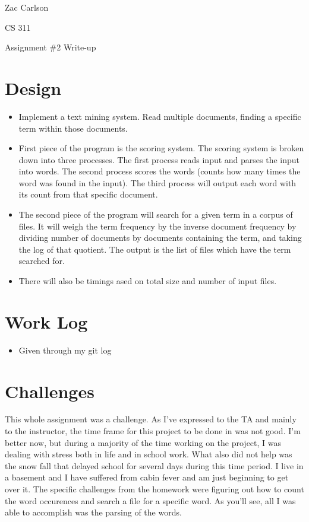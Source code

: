 \documentclass[12pt]{article}
\begin{document}
\hfill{Zac Carlson}

\hfill{CS 311}

\hfill{Assignment \#2 Write-up}

\null

\section{Design}

\begin{itemize}
\item Implement a text mining system. Read multiple documents, finding a specific term within those documents.
\item First piece of the program is the scoring system. The scoring system is broken down into three processes. The first process reads input and parses the input into words. The second process scores the words (counts how many times the word was found in the input). The third process will output each word with its count from that specific document. 
\item The second piece of the program will search for a given term in a corpus of files. It will weigh the term frequency by the inverse document frequency by dividing number of documents by documents containing the term, and taking the log of that quotient. The output is the list of files which have the term searched for.
\item There will also be timings ased on total size and number of input files.
\end{itemize}

\section{Work Log}
\begin{itemize}

\item Given through my git log

\end{itemize}

\section{Challenges}

This whole assignment was a challenge. As I've expressed to the TA and mainly to the instructor, the time frame for this project to be done in was not good. I'm better now, but during a majority of the time working on the project, I was dealing with stress both in life and in school work. What also did not help was the snow fall that delayed school for several days during this time period. I live in a basement and I have suffered from cabin fever and am just beginning to get over it. The specific challenges from the homework were figuring out how to count the word occurences and search a file for a specific word. As you'll see, all I was able to accomplish was the parsing of the words.
\end{document}
